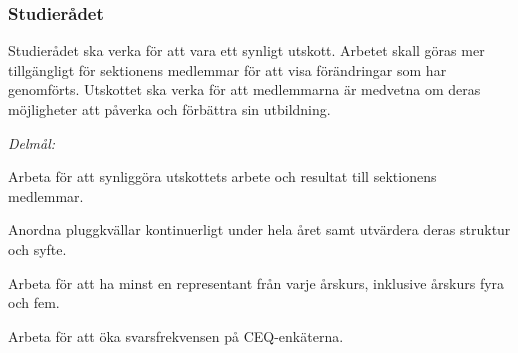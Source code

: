 \documentclass[../_main/handlingar.tex]{subfiles}
\begin{document}
\subsubsection*{Studierådet}
Studierådet ska verka för att vara ett synligt utskott. Arbetet skall göras mer tillgängligt för sektionens medlemmar för att visa förändringar som har genomförts. Utskottet ska verka för att medlemmarna är medvetna om deras möjligheter att påverka och förbättra sin utbildning.

\emph{Delmål:}
\begin{dashlist}
    \item Arbeta för att synliggöra utskottets arbete och resultat till sektionens medlemmar.
    \item Anordna pluggkvällar kontinuerligt under hela året samt utvärdera deras struktur och syfte.
    \item Arbeta för att ha minst en representant från varje årskurs, inklusive årskurs fyra och fem.
    \item Arbeta för att öka svarsfrekvensen på CEQ-enkäterna.
\end{dashlist}

\newpage
\end{document}
